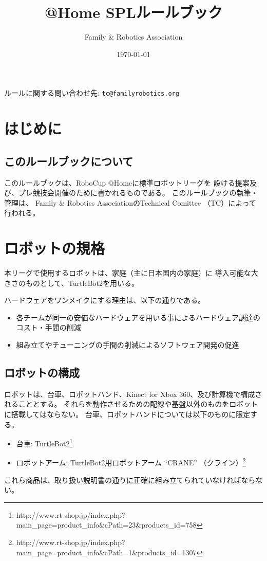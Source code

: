 \documentclass[a4j]{jarticle}
\title{@Home SPLルールブック}
\author{Family \& Robotics Association}
\date{\today}
\begin{document}
%
%
\maketitle

\begin{center}
ルールに関する問い合わせ先: {\tt tc@familyrobotics.org}
\end{center}

\vspace{3em}
%
%
\tableofcontents
\newpage

\section{はじめに}

\subsection{このルールブックについて}

このルールブックは、RoboCup @Homeに標準ロボットリーグを
設ける提案及び、プレ競技会開催のために書かれるものである。
このルールブックの執筆・管理は、
Family \& Robotics AssociationのTechnical Comittee
（TC）によって行われる。

\section{ロボットの規格}

本リーグで使用するロボットは、家庭（主に日本国内の家庭）に
導入可能な大きさのものとして、TurtleBot2を用いる。

ハードウェアをワンメイクにする理由は、以下の通りである。
\begin{itemize}
	\item 各チームが同一の安価なハードウェアを用いる事によるハードウェア調達のコスト・手間の削減
	\item 組み立てやチューニングの手間の削減によるソフトウェア開発の促進
\end{itemize}

\subsection{ロボットの構成}

ロボットは、台車、ロボットハンド、Kinect for Xbox 360、及び計算機で構成されることとする。
それらを動作させるための配線や基盤以外のものをロボットに搭載してはならない。
台車、ロボットハンドについては以下のものに限定する。
\begin{itemize}
	\item 台車: TurtleBot2\footnote{http://www.rt-shop.jp/index.php?main\_page=product\_info\&cPath=23\&products\_id=758}
	\item ロボットアーム: TurtleBot2用ロボットアーム ``CRANE'' （クライン）\footnote{http://www.rt-shop.jp/index.php?main\_page=product\_info\&cPath=1\&products\_id=1307}
\end{itemize}
これら商品は、取り扱い説明書の通りに正確に組み立てられていなければならない。
\end{document}
